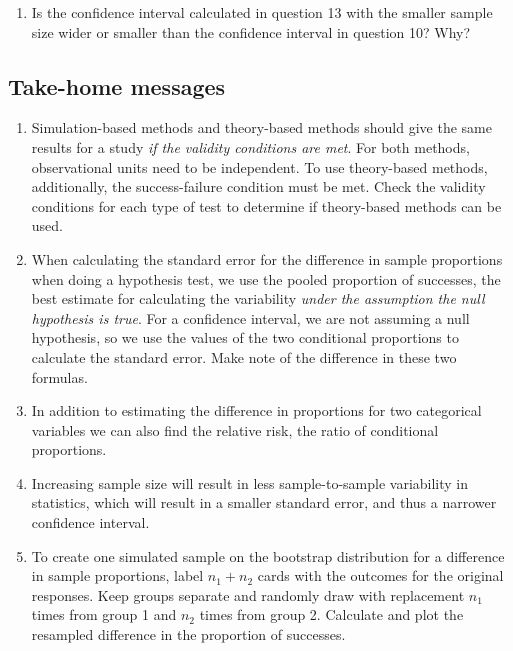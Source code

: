 \documentclass[
]{report}
\providecommand{\tightlist}{%
  \setlength{\itemsep}{0pt}\setlength{\parskip}{0pt}}
\begin{document}
\vspace{.8in}

\begin{enumerate}
\def\labelenumi{\arabic{enumi}.}
\setcounter{enumi}{14}
\tightlist
\item
  Is the confidence interval calculated in question 13 with the smaller sample size wider or smaller than the confidence interval in question 10? Why?
\end{enumerate}

\vspace{.8in}

\hypertarget{take-home-messages-16}{%
\subsection{Take-home messages}\label{take-home-messages-16}}

\begin{enumerate}
\def\labelenumi{\arabic{enumi}.}
\item
  Simulation-based methods and theory-based methods should give the same results for a study \emph{if the validity conditions are met}. For both methods, observational units need to be independent. To use theory-based methods, additionally, the success-failure condition must be met. Check the validity conditions for each type of test to determine if theory-based methods can be used.
\item
  When calculating the standard error for the difference in sample proportions when doing a hypothesis test, we use the pooled proportion of successes, the best estimate for calculating the variability \emph{under the assumption the null hypothesis is true}. For a confidence interval, we are not assuming a null hypothesis, so we use the values of the two conditional proportions to calculate the standard error. Make note of the difference in these two formulas.
\item
  In addition to estimating the difference in proportions for two categorical variables we can also find the relative risk, the ratio of conditional proportions.
\item
  Increasing sample size will result in less sample-to-sample variability in statistics, which will result in a smaller standard error, and thus a narrower confidence interval.
\item
  To create one simulated sample on the bootstrap distribution for a difference in sample proportions, label \(n_1 + n_2\) cards with the outcomes for the original responses. Keep groups separate and randomly draw with replacement \(n_1\) times from group 1 and \(n_2\) times from group 2. Calculate and plot the resampled difference in the proportion of successes.
\end{enumerate}
\end{document}
